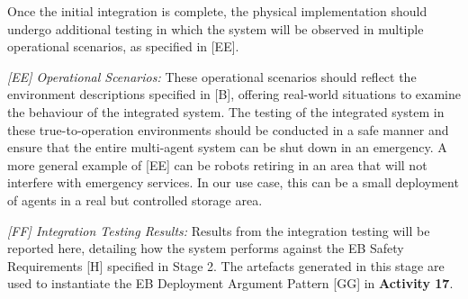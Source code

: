 \documentclass[runningheads]{llncs}
\begin{document}
Once the initial integration is complete, the physical implementation should undergo additional testing in which the system will be observed in multiple operational scenarios, as specified in [EE].

\emph{[EE] Operational Scenarios:} These operational scenarios should reflect the environment descriptions specified in [B], offering real-world situations to examine the behaviour of the integrated system. 
The testing of the integrated system in these true-to-operation environments should be conducted in a safe manner and ensure that the entire multi-agent system can be shut down in an emergency. 
A more general example of [EE] can be robots retiring in an area that will not interfere with emergency services. In our use case, this can be a small deployment of agents in a real but controlled storage area.

\emph{[FF] Integration Testing Results:} Results from the integration testing will be reported here, detailing how the system performs against the EB Safety Requirements [H] specified in Stage 2. 
The artefacts generated in this stage are used to instantiate the EB Deployment Argument Pattern [GG] in \textbf{Activity 17}.

\end{document}
